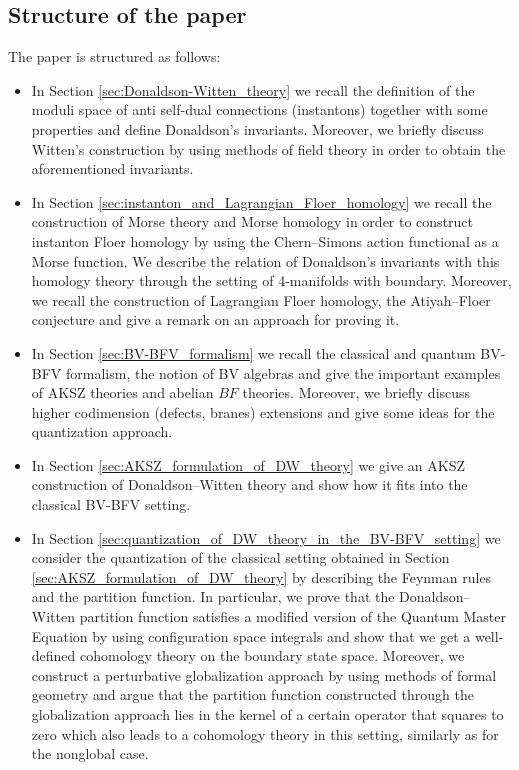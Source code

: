 \documentclass[11pt,colorinlistoftodos]{amsart}
\numberwithin{equation}{subsection}
\theoremstyle{plain}
\theoremstyle{definition}
\theoremstyle{remark}
\begin{document}
\subsection{Structure of the paper}
The paper is structured as follows:
\begin{itemize}
    \item In Section \ref{sec:Donaldson-Witten_theory} we recall the definition of the moduli space of anti self-dual connections (instantons) together with some properties and define Donaldson's invariants. Moreover, we briefly discuss Witten's construction by using methods of field theory in order to obtain the aforementioned invariants.
    \item In Section \ref{sec:instanton_and_Lagrangian_Floer_homology} we recall the construction of Morse theory and Morse homology in order to construct instanton Floer homology by using the Chern--Simons action functional as a Morse function. We describe the relation of Donaldson's invariants with this homology theory through the setting of 4-manifolds with boundary.
    Moreover, we recall the construction of Lagrangian Floer homology, the Atiyah--Floer conjecture and give a remark on an approach for proving it.
    \item In Section \ref{sec:BV-BFV_formalism} we recall the classical and quantum BV-BFV formalism, the notion of BV algebras and give the important examples of AKSZ theories and abelian $BF$ theories. Moreover, we briefly discuss higher codimension (defects, branes) extensions and give some ideas for the quantization approach.
    \item In Section \ref{sec:AKSZ_formulation_of_DW_theory} we give an AKSZ construction of Donaldson--Witten theory and show how it fits into the classical BV-BFV setting.
    \item In Section \ref{sec:quantization_of_DW_theory_in_the_BV-BFV_setting} we consider the quantization of the classical setting obtained in Section \ref{sec:AKSZ_formulation_of_DW_theory} by describing the Feynman rules and the partition function. In particular, we prove that the Donaldson--Witten partition function satisfies a modified version of the Quantum Master Equation by using configuration space integrals and show that we get a well-defined cohomology theory on the boundary state space. Moreover, we construct a perturbative globalization approach by using methods of formal geometry and argue that the partition function constructed through the globalization approach lies in the kernel of a certain operator that squares to zero which also leads to a cohomology theory in this setting, similarly as for the nonglobal case.

\end{itemize}
\end{document}

